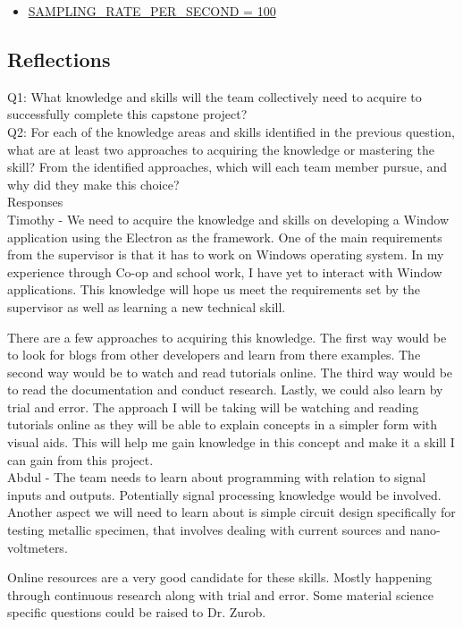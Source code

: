 \documentclass[12pt, titlepage]{article}
\begin{document}
\begin{itemize}
    \color{red}
    \item \hyperref[sec:sampling]{SAMPLING\_RATE\_PER\_SECOND = 100}
\end{itemize}

\subsection{Reflections}

\noindent Q1: What knowledge and skills will the team collectively need to acquire to successfully complete this capstone project? \\
\noindent Q2: For each of the knowledge areas and skills identified in the previous question, what are at least two approaches to acquiring the knowledge or mastering the skill? 
From the identified approaches, which will each team member pursue, and why did they make this choice?\\

\noindent Responses\\


Timothy - We need to acquire the knowledge and skills on developing a Window application using the Electron as the framework. One of the main requirements
from the supervisor is that it has to work on Windows operating system. In my experience through Co-op and school work, I have 
yet to interact with Window applications. This knowledge will hope us meet the requirements set by the supervisor as well 
as learning a new technical skill. 

There are a few approaches to acquiring this knowledge. The first way would be to look for blogs from other developers and learn from there
examples. The second way would be to watch and read tutorials online. The third way would be to read the documentation and conduct research. Lastly, 
we could also learn by trial and error. The approach I will be taking will be watching and reading tutorials online as they will be able to explain 
concepts in a simpler form with visual aids. This will help me gain knowledge in this concept and 
make it a skill I can gain from this project.\\

Abdul - The team needs to learn about programming with relation to signal inputs and outputs. Potentially signal processing knowledge would be involved. Another aspect we will need to learn about is simple circuit design specifically for testing metallic specimen, that involves dealing with current sources and nano-voltmeters.

Online resources are a very good candidate for these skills. Mostly happening through continuous research along with trial and error. Some material science specific questions could be raised to Dr. Zurob.\\
\end{document}
